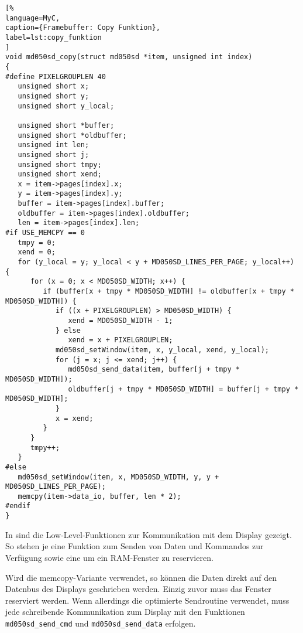 \begin{lstlisting}[%
language=MyC,
caption={Framebuffer: Copy Funktion},
label=lst:copy_funktion
]
void md050sd_copy(struct md050sd *item, unsigned int index)
{
#define PIXELGROUPLEN 40
   unsigned short x;
   unsigned short y;
   unsigned short y_local;

   unsigned short *buffer;
   unsigned short *oldbuffer;
   unsigned int len;
   unsigned short j;
   unsigned short tmpy;
   unsigned short xend;
   x = item->pages[index].x;
   y = item->pages[index].y;
   buffer = item->pages[index].buffer;
   oldbuffer = item->pages[index].oldbuffer;
   len = item->pages[index].len;
#if USE_MEMCPY == 0
   tmpy = 0;
   xend = 0;
   for (y_local = y; y_local < y + MD050SD_LINES_PER_PAGE; y_local++) {
      for (x = 0; x < MD050SD_WIDTH; x++) {
         if (buffer[x + tmpy * MD050SD_WIDTH] != oldbuffer[x + tmpy * MD050SD_WIDTH]) {
            if ((x + PIXELGROUPLEN) > MD050SD_WIDTH) {
               xend = MD050SD_WIDTH - 1;
            } else
               xend = x + PIXELGROUPLEN;
            md050sd_setWindow(item, x, y_local, xend, y_local);
            for (j = x; j <= xend; j++) {
               md050sd_send_data(item, buffer[j + tmpy * MD050SD_WIDTH]);
               oldbuffer[j + tmpy * MD050SD_WIDTH] = buffer[j + tmpy * MD050SD_WIDTH];
            }
            x = xend;
         }
      }
      tmpy++;
   }
#else
   md050sd_setWindow(item, x, MD050SD_WIDTH, y, y + MD050SD_LINES_PER_PAGE);
   memcpy(item->data_io, buffer, len * 2);
#endif
}
\end{lstlisting}
In  sind die Low-Level-Funktionen zur Kommunikation mit dem Display gezeigt. So stehen je eine Funktion zum Senden von Daten und Kommandos zur Verfügung sowie eine um ein RAM-Fenster zu reservieren. 

Wird die memcopy-Variante verwendet, so können die Daten direkt auf den Datenbus des Displays geschrieben werden. Einzig zuvor muss das Fenster reserviert werden. Wenn allerdings die optimierte Sendroutine verwendet, muss jede schreibende Kommunikation zum Display mit den Funktionen \lstinline|md050sd_send_cmd| und \lstinline|md050sd_send_data| erfolgen. 

